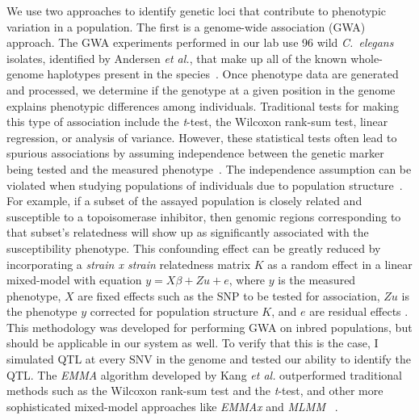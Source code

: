 \documentclass[12pt]{article}
\begin{document}
We use two approaches to identify genetic loci that contribute to phenotypic variation in a population. The first is a genome-wide association (GWA) approach. The GWA experiments performed in our lab use 96 wild {\it C.~elegans} isolates, identified by Andersen {\it et al.}, that make up all of the known whole-genome haplotypes present in the species~\cite{Andersen:2012gm}. Once phenotype data are generated and processed, we determine if the genotype at a given position in the genome explains phenotypic differences among individuals. Traditional tests for making this type of association include the {\it t}-test, the Wilcoxon rank-sum test, linear regression, or analysis of variance. However, these statistical tests often lead to spurious associations by assuming independence between the genetic marker being tested and the measured phenotype~\cite{Kang:2008bx}. The independence assumption can be violated when studying populations of individuals due to population structure~\cite{Price:2010fc}. For example, if a subset of the assayed population is closely related and susceptible to a topoisomerase inhibitor, then genomic regions corresponding to that subset's relatedness will show up as significantly associated with the susceptibility phenotype. This confounding effect can be greatly reduced by incorporating a {\it strain x strain} relatedness matrix $K$ as a random effect in a linear mixed-model with equation $y = X\beta + Zu +e$, where $y$ is the measured phenotype, $X$ are fixed effects such as the SNP to be tested for association, $Zu$ is the phenotype $y$ corrected for population structure $K$, and $e$ are residual effects \cite{Kang:2008bx}. This methodology was developed for performing GWA on inbred populations, but should be applicable in our system as well. To verify that this is the case, I simulated QTL at every SNV in the genome and tested our ability to identify the QTL. The {\it EMMA} algorithm developed by Kang {\it et al.} outperformed traditional methods such as the Wilcoxon rank-sum test and the {\it t}-test, and other more sophisticated mixed-model approaches like {\it EMMAx} and {\it MLMM} ~\cite{Kang:2010fg,Segura:2012hi}.

\vspace{5pt}
\end{document}
